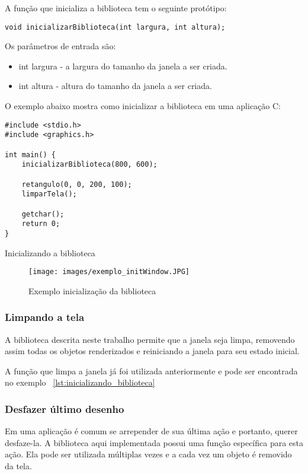 \documentclass[12pt, %
openright,
oneside, %
a4paper,    %
brazil]{facom-ufu-abntex2}
\begin{document}
A função que inicializa a biblioteca tem o seguinte protótipo:

\begin{verbatim}
void inicializarBiblioteca(int largura, int altura);
\end{verbatim}

Os parâmetros de entrada são:

\begin{itemize}
    \item int largura - a largura do tamanho da janela a ser criada.
    \item int altura -  altura do tamanho da janela a ser criada.
\end{itemize}

O exemplo abaixo mostra como inicializar a biblioteca em uma aplicação C:
\begin{listing}[ht]
\begin{verbatim}
#include <stdio.h>
#include <graphics.h>

int main() {
    inicializarBiblioteca(800, 600);

    retangulo(0, 0, 200, 100);
    limparTela();

    getchar();
    return 0;
}
\end{verbatim}
\caption{Inicializando a biblioteca}
\label{lst:inicializando_biblioteca}
\end{listing}

\begin{figure}[!htbp]
  \centering
  \texttt{[image: images/exemplo\_initWindow.JPG]}
  \caption{Exemplo inicialização da biblioteca}
  \label{fig:exemplo_initWindow}
\end{figure}

\subsubsection{Limpando a tela}
A biblioteca descrita neste trabalho permite que a janela seja limpa, removendo assim todas os objetos renderizados e reiniciando a janela para seu estado inicial.

A função que limpa a janela já foi utilizada anteriormente e pode ser encontrada no exemplo ~\ref{lst:inicializando_biblioteca}

\subsubsection{Desfazer último desenho}
Em uma aplicação é comum se arrepender de sua última ação e portanto, querer desfaze-la. A biblioteca aqui implementada possui uma função específica para esta ação. Ela pode ser utilizada múltiplas vezes e a cada vez um objeto é removido da tela.
\end{document}
